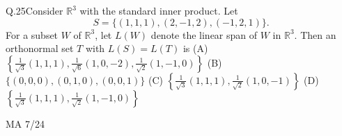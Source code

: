\documentclass{article}
\begin{document}
																															Q.25\quad Consider $\mathbb{R}^3$ with the standard inner product. Let\\
																															\[
																															S = \{(1,1,1), (2,-1,2), (-1,2,1)\}.
																															\]
																															For a subset $W$ of $\mathbb{R}^3$, let $L(W)$ denote the linear span of $W$ in $\mathbb{R}^3$. Then an orthonormal set $T$ with $L(S) = L(T)$ is
																															\newline
																															\noindent (A)  $\left\{ \frac{1}{\sqrt{3}}(1,1,1), \frac{1}{\sqrt{6}}(1,0,-2), \frac{1}{\sqrt{2}}(1,-1,0) \right\}$ \hspace{4cm} (B)$\{(0,0,0), (0,1,0), (0,0,1)\}$
																															\newline \noindent (C) $\left\{ \frac{1}{\sqrt{3}}(1,1,1), \frac{1}{\sqrt{2}}(1,0,-1) \right\}$\hspace{6cm}  (D) $\left\{ \frac{1}{\sqrt{3}}(1,1,1), \frac{1}{\sqrt{2}}(1,-1,0) \right\}$
																															\vspace{10em}
																															\begin{center}
																															    {MA 7/24}
																															    \end{center}
\end{document}
